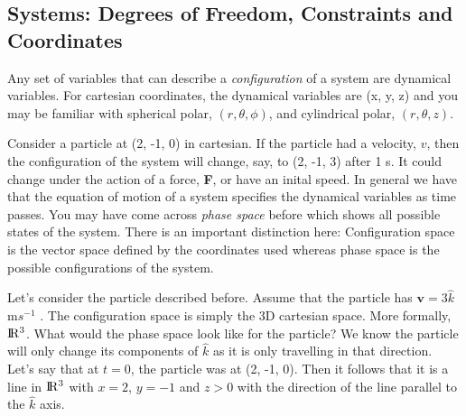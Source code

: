 \subsection{Systems: Degrees of Freedom, Constraints and Coordinates}
Any set of variables that can describe a \textit{configuration} of a system are dynamical variables. For cartesian coordinates, the dynamical variables are (x, y, z) and you may be familiar with spherical polar, $(r, \theta, \phi)$, and cylindrical polar, $(r, \theta, z)$. \par
Consider a particle at (2, -1, 0) in cartesian. If the particle had a velocity, $v$, then the configuration of the system will change, say, to (2, -1, 3) after 1 s. It could change under the action of a force, \textbf{F}, or have an inital speed. In general we have that the equation of motion of a system specifies the dynamical variables as time passes. 
You may have come across \textit{phase space} before which shows all possible states of the system. There is an important distinction here: Configuration space is the vector space defined by the coordinates used whereas phase space is the possible configurations of the system. \par

Let's consider the particle described before. Assume that the particle has $\textbf{v} = 3\hat{k}$ m$s^{-1}$ . The configuration space is simply the 3D cartesian space. More formally, $\rm I\!R^{3}$. What would the phase space look like for the particle? We know the particle will only change its components of $\hat{k}$ as it is only travelling in that direction. Let's say that at $t=0$, the particle was at (2, -1, 0). Then it follows that it is a line in $\rm I\!R^{3}$ with $x=2$, $y=-1$ and $z>0$ with the direction of the line parallel to the $\hat{k}$ axis.\par

